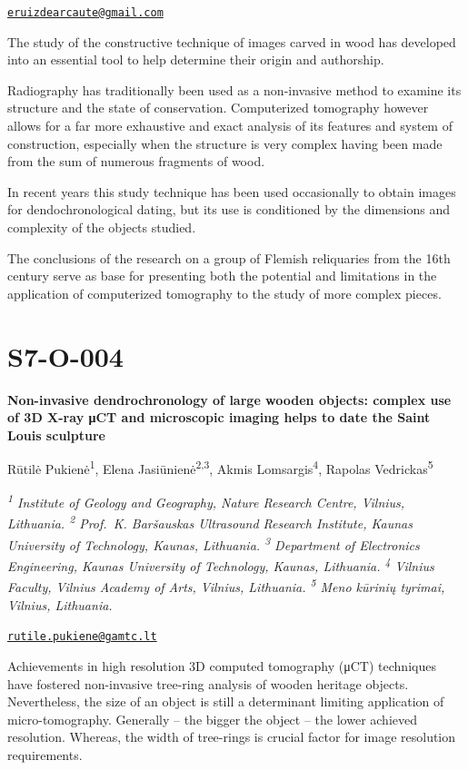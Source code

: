 \documentclass[
]{book}
\begin{document}
\href{mailto:eruizdearcaute@gmail.com}{\nolinkurl{eruizdearcaute@gmail.com}}

The study of the constructive technique of images carved in wood has developed into an essential tool to help determine their origin and authorship.

Radiography has traditionally been used as a non-invasive method to examine its structure and the state of conservation. Computerized tomography however allows for a far more exhaustive and exact analysis of its features and system of construction, especially when the structure is very complex having been made from the sum of numerous fragments of wood.

In recent years this study technique has been used occasionally to obtain images for dendochronological dating, but its use is conditioned by the dimensions and complexity of the objects studied.

The conclusions of the research on a group of Flemish reliquaries from the 16th century serve as base for presenting both the potential and limitations in the application of computerized tomography to the study of more complex pieces.

\hypertarget{s7-o-004}{%
\section*{S7-O-004}\label{s7-o-004}}

\textbf{Non-invasive dendrochronology of large wooden objects: complex use of 3D X-ray μCT and microscopic imaging helps to date the Saint Louis sculpture}

Rūtilė Pukienė\textsuperscript{1}, Elena Jasiūnienė\textsuperscript{2,3}, Akmis Lomsargis\textsuperscript{4}, Rapolas Vedrickas\textsuperscript{5}

\emph{\textsuperscript{1} Institute of Geology and Geography, Nature Research Centre, Vilnius, Lithuania. \textsuperscript{2} Prof.~K. Baršauskas Ultrasound Research Institute, Kaunas University of Technology, Kaunas, Lithuania. \textsuperscript{3} Department of Electronics Engineering, Kaunas University of Technology, Kaunas, Lithuania. \textsuperscript{4} Vilnius Faculty, Vilnius Academy of Arts, Vilnius, Lithuania. \textsuperscript{5} Meno kūrinių tyrimai, Vilnius, Lithuania.}

\href{mailto:rutile.pukiene@gamtc.lt}{\nolinkurl{rutile.pukiene@gamtc.lt}}

Achievements in high resolution 3D computed tomography (μCT) techniques have fostered non-invasive tree-ring analysis of wooden heritage objects. Nevertheless, the size of an object is still a determinant limiting application of micro-tomography. Generally -- the bigger the object -- the lower achieved resolution. Whereas, the width of tree-rings is crucial factor for image resolution requirements.
\end{document}
